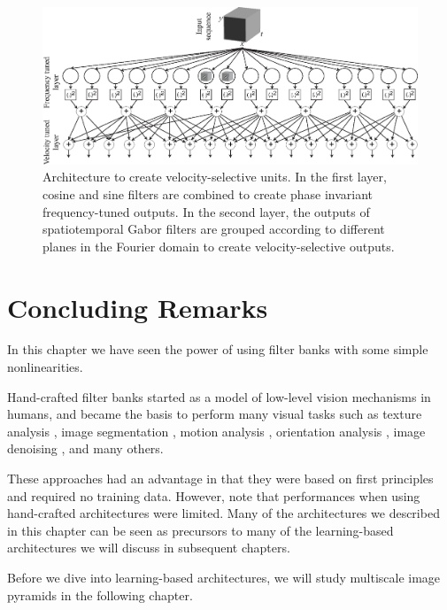 \begin{figure}[t]
\centerline{
\includegraphics[width=1\linewidth]{figures/temporal_filters/MT_velocity_tuned.eps}
}
\caption{Architecture to create velocity-selective units. In the first layer, cosine and sine filters are combined to create phase invariant frequency-tuned outputs. In the second layer, the outputs of spatiotemporal Gabor filters are grouped according to different planes in the Fourier domain to create velocity-selective outputs. }
\label{fig:MT_velocity_tuned}
\end{figure}







\section{Concluding Remarks}

In this chapter we have seen the power of using filter banks with some simple nonlinearities.

Hand-crafted filter banks started as a model of low-level vision mechanisms in humans, and became the basis to perform many visual tasks such as texture analysis \cite{RG:Heeger-Bergen95}, image segmentation \cite{Perona91}, motion analysis \cite{Heeger92}, orientation analysis \cite{Freeman90c}, image denoising \cite{Simoncelli96}, and many others. 

These approaches had an advantage in that they were based on first principles and required no training data. However, note that performances when using hand-crafted architectures were limited. Many of the architectures we described in this chapter can be seen as precursors to many of the learning-based architectures we will discuss in subsequent chapters. 

Before we dive into learning-based architectures, we will study multiscale image pyramids in the following chapter. 


